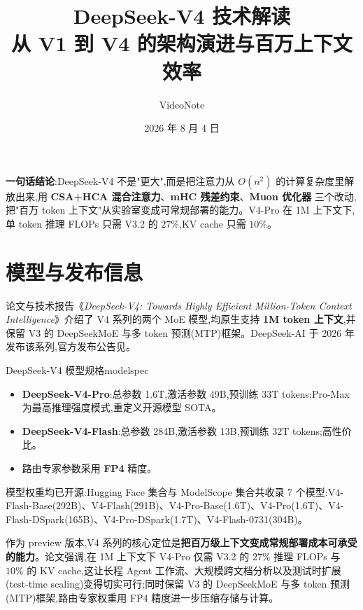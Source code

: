 \documentclass{MathNoteCN}
\title{DeepSeek-V4 技术解读\\ 从 V1 到 V4 的架构演进与百万上下文效率}
\author{VideoNote}
\date{2026 年 8 月 4 日}
\begin{document}
\maketitle

\begin{note}
\textbf{一句话结论}:DeepSeek-V4 不是"更大",而是把注意力从 $O(n^2)$ 的计算复杂度里解放出来,用 \textbf{CSA+HCA 混合注意力}、\textbf{mHC 残差约束}、\textbf{Muon 优化器} 三个改动,把"百万 token 上下文"从实验室变成可常规部署的能力。V4-Pro 在 1M 上下文下,单 token 推理 FLOPs 只需 V3.2 的 $27\%$,KV cache 只需 $10\%$。
\end{note}

\section{模型与发布信息}

论文\cite{arxiv}与技术报告\cite{report}《\textit{DeepSeek-V4: Towards Highly Efficient Million-Token Context Intelligence}》介绍了 V4 系列的两个 MoE 模型,均原生支持 \textbf{1M token 上下文},并保留 V3 的 DeepSeekMoE 与多 token 预测(MTP)框架。DeepSeek-AI 于 2026 年发布该系列,官方发布公告见\cite{wechat}。

\begin{definition}{DeepSeek-V4 模型规格}{modelspec}
\begin{itemize}
  \item \textbf{DeepSeek-V4-Pro}:总参数 1.6T,激活参数 49B,预训练 33T tokens;Pro-Max 为最高推理强度模式,重定义开源模型 SOTA。
  \item \textbf{DeepSeek-V4-Flash}:总参数 284B,激活参数 13B,预训练 32T tokens;高性价比。
  \item 路由专家参数采用 \textbf{FP4} 精度。
\end{itemize}
\end{definition}

模型权重均已开源:Hugging Face 集合\cite{hf}与 ModelScope 集合\cite{ms}共收录 7 个模型:V4-Flash-Base(292B)、V4-Flash(291B)、V4-Pro-Base(1.6T)、V4-Pro(1.6T)、V4-Flash-DSpark(165B)、V4-Pro-DSpark(1.7T)、V4-Flash-0731(304B)。

作为 preview 版本,V4 系列的核心定位是\textbf{把百万级上下文变成常规部署成本可承受的能力}。论文强调,在 1M 上下文下 V4-Pro 仅需 V3.2 的 $27\%$ 推理 FLOPs 与 $10\%$ 的 KV cache,这让长程 Agent 工作流、大规模跨文档分析以及测试时扩展(test-time scaling)变得切实可行;同时保留 V3 的 DeepSeekMoE 与多 token 预测(MTP)框架,路由专家权重用 FP4 精度进一步压缩存储与计算。
\end{document}
